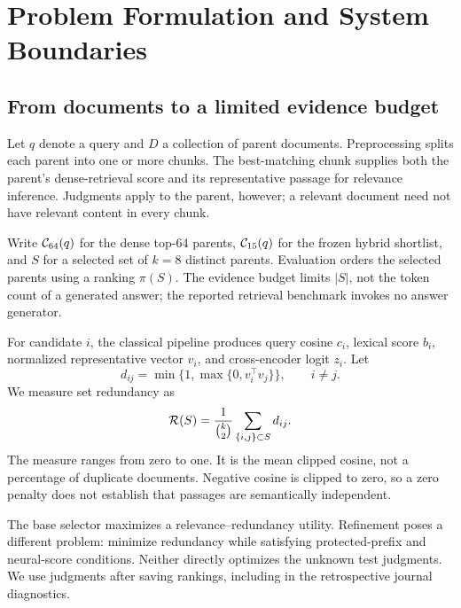 \section{Problem Formulation and System Boundaries}\label{sec:formulation}
\subsection{From documents to a limited evidence budget}
Let $q$ denote a query and $D$ a collection of parent documents. Preprocessing splits each parent into one or more chunks. The best-matching chunk supplies both the parent's dense-retrieval score and its representative passage for relevance inference. Judgments apply to the parent, however; a relevant document need not have relevant content in every chunk.

Write $\mathcal{C}_{64}(q)$ for the dense top-64 parents, $\mathcal{C}_{15}(q)$ for the frozen hybrid shortlist, and $S$ for a selected set of $k=8$ distinct parents. Evaluation orders the selected parents using a ranking $\pi(S)$. The evidence budget limits $|S|$, not the token count of a generated answer; the reported retrieval benchmark invokes no answer generator.

For candidate $i$, the classical pipeline produces query cosine $c_i$, lexical score $b_i$, normalized representative vector $v_i$, and cross-encoder logit $z_i$. Let
\begin{equation}
d_{ij}=\min\{1,\max\{0,v_i^\top v_j\}\},\qquad i\ne j.
\label{eq:pair_similarity}
\end{equation}
We measure set redundancy as
\begin{equation}
\mathcal{R}(S)=\frac{1}{\binom{k}{2}}\sum_{\{i,j\}\subset S}d_{ij}.
\label{eq:redundancy}
\end{equation}
The measure ranges from zero to one. It is the mean clipped cosine, not a percentage of duplicate documents. Negative cosine is clipped to zero, so a zero penalty does not establish that passages are semantically independent.

The base selector maximizes a relevance--redundancy utility. Refinement poses a different problem: minimize redundancy while satisfying protected-prefix and neural-score conditions. Neither directly optimizes the unknown test judgments. We use judgments after saving rankings, including in the retrospective journal diagnostics.

